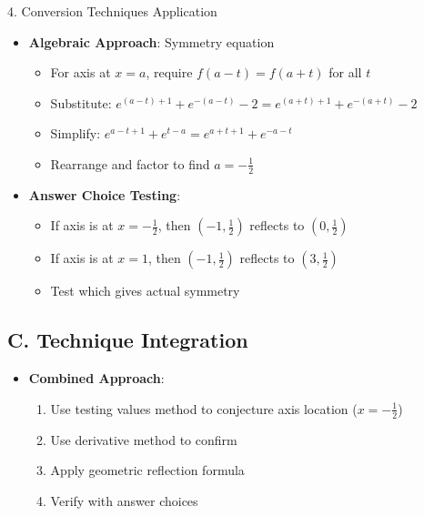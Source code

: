 \documentclass[12pt]{article}
\begin{document}
\begin{conversionbox}{4. Conversion Techniques Application}
\begin{itemize}[leftmargin=*]
    \item \textbf{Algebraic Approach}: Symmetry equation
    \begin{itemize}
        \item For axis at $x = a$, require $f(a-t) = f(a+t)$ for all $t$
        \item Substitute: $e^{(a-t)+1} + e^{-(a-t)} - 2 = e^{(a+t)+1} + e^{-(a+t)} - 2$
        \item Simplify: $e^{a-t+1} + e^{t-a} = e^{a+t+1} + e^{-a-t}$
        \item Rearrange and factor to find $a = -\frac{1}{2}$
    \end{itemize}
    
    \item \textbf{Answer Choice Testing}:
    \begin{itemize}
        \item If axis is at $x = -\frac{1}{2}$, then $(-1, \frac{1}{2})$ reflects to $(0, \frac{1}{2})$
        \item If axis is at $x = 1$, then $(-1, \frac{1}{2})$ reflects to $(3, \frac{1}{2})$
        \item Test which gives actual symmetry
    \end{itemize}
\end{itemize}

\subsection*{C. Technique Integration}
\begin{itemize}[leftmargin=*]
    \item \textbf{Combined Approach}:
    \begin{enumerate}
        \item Use testing values method to conjecture axis location ($x = -\frac{1}{2}$)
        \item Use derivative method to confirm
        \item Apply geometric reflection formula
        \item Verify with answer choices
    \end{enumerate}
\end{itemize}

\end{conversionbox}
\end{document}
